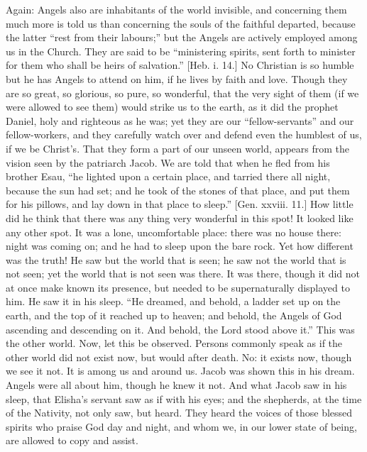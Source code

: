 Again: Angels also are inhabitants of the world invisible, and
concerning them much more is told us than concerning the souls of the
faithful departed, because the latter ``rest from their labours;''
but the Angels are actively employed among us in the Church. They are
said to be ``ministering spirits, sent forth to minister for them
who shall be heirs of salvation.'' [Heb. i. 14.] No Christian is
so humble but he has Angels to attend on him, if he lives by faith and
love. Though they are so great, so glorious, so pure, so wonderful,
that the very sight of them (if we were allowed to see them) would
strike us to the earth, as it did the prophet Daniel, holy and
righteous as he was; yet they are our ``fellow-servants'' and
our fellow-workers, and they carefully watch over and defend even the
humblest of us, if we be Christ's. That they form a part of our unseen
world, appears from the vision seen by the patriarch Jacob. We are
told that when he fled from his brother Esau, ``he lighted upon a
certain place, and tarried there all night, because the sun had set;
and he took of the stones of that place, and put them for his pillows,
and lay down in that place to sleep.'' [Gen. xxviii. 11.] How
little did he think that there was any thing very wonderful in this
spot! It looked like any other spot. It was a lone, uncomfortable
place: there was no house there: night was coming on; and he had to
sleep upon the bare rock. Yet how different was the truth! He saw but
the world that is seen; he saw not the world that is not seen; yet the
world that is not seen was there. It was there, though it did not at
once make known its presence, but needed to be supernaturally
displayed to him. He saw it in his sleep. ``He dreamed, and
behold, a ladder set up on the earth, and the top of it reached up to
heaven; and behold, the Angels of God ascending and descending on it.
And behold, the Lord stood above it.'' This was the other world.
Now, let this be observed. Persons commonly speak as if the other
world did not exist now, but would after death. No: it exists now,
though we see it not. It is among us and around us. Jacob was shown
this in his dream. Angels were all about him, though he knew it not.
And what Jacob saw in his sleep, that Elisha's servant saw as if with
his eyes; and the shepherds, at the time of the Nativity, not only
saw, but heard. They heard the voices of those blessed spirits who
praise God day and night, and whom we, in our lower state of being,
are allowed to copy and assist.

